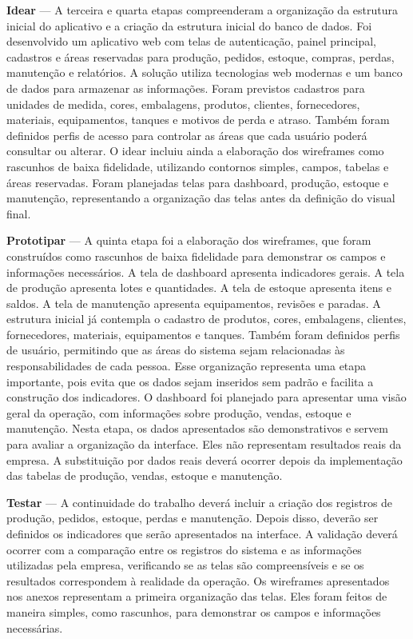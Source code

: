\documentclass[12pt,a4paper]{article}
\begin{document}
\textbf{Idear} — A terceira e quarta etapas compreenderam a organização da estrutura inicial do aplicativo e a criação da estrutura inicial do banco de dados. Foi desenvolvido um aplicativo web com telas de autenticação, painel principal, cadastros e áreas reservadas para produção, pedidos, estoque, compras, perdas, manutenção e relatórios. A solução utiliza tecnologias web modernas e um banco de dados para armazenar as informações. Foram previstos cadastros para unidades de medida, cores, embalagens, produtos, clientes, fornecedores, materiais, equipamentos, tanques e motivos de perda e atraso. Também foram definidos perfis de acesso para controlar as áreas que cada usuário poderá consultar ou alterar. O idear incluiu ainda a elaboração dos wireframes como rascunhos de baixa fidelidade, utilizando contornos simples, campos, tabelas e áreas reservadas. Foram planejadas telas para dashboard, produção, estoque e manutenção, representando a organização das telas antes da definição do visual final.

\textbf{Prototipar} — A quinta etapa foi a elaboração dos wireframes, que foram construídos como rascunhos de baixa fidelidade para demonstrar os campos e informações necessários. A tela de dashboard apresenta indicadores gerais. A tela de produção apresenta lotes e quantidades. A tela de estoque apresenta itens e saldos. A tela de manutenção apresenta equipamentos, revisões e paradas. A estrutura inicial já contempla o cadastro de produtos, cores, embalagens, clientes, fornecedores, materiais, equipamentos e tanques. Também foram definidos perfis de usuário, permitindo que as áreas do sistema sejam relacionadas às responsabilidades de cada pessoa. Esse organização representa uma etapa importante, pois evita que os dados sejam inseridos sem padrão e facilita a construção dos indicadores. O dashboard foi planejado para apresentar uma visão geral da operação, com informações sobre produção, vendas, estoque e manutenção. Nesta etapa, os dados apresentados são demonstrativos e servem para avaliar a organização da interface. Eles não representam resultados reais da empresa. A substituição por dados reais deverá ocorrer depois da implementação das tabelas de produção, vendas, estoque e manutenção.

\textbf{Testar} — A continuidade do trabalho deverá incluir a criação dos registros de produção, pedidos, estoque, perdas e manutenção. Depois disso, deverão ser definidos os indicadores que serão apresentados na interface. A validação deverá ocorrer com a comparação entre os registros do sistema e as informações utilizadas pela empresa, verificando se as telas são compreensíveis e se os resultados correspondem à realidade da operação. Os wireframes apresentados nos anexos representam a primeira organização das telas. Eles foram feitos de maneira simples, como rascunhos, para demonstrar os campos e informações necessárias.
\end{document}
